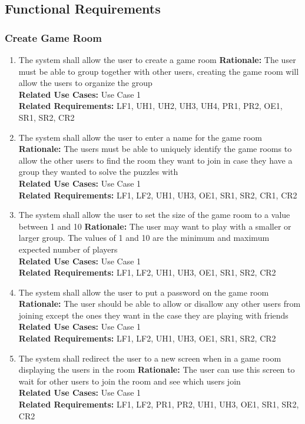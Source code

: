 \documentclass[12pt]{article}
\begin{document}
\subsection{Functional Requirements}
\subsubsection{Create Game Room}
\begin{enumerate}[label=CG\arabic*., series=CreateGame]
    \item The system shall allow the user to create a game room \newline 
    \textbf{Rationale:} The user must be able to group together with other users, creating the game room will allow the users to organize the group\\
    \textbf{Related Use Cases:} Use Case 1\\
    \textbf{Related Requirements:} LF1, UH1, UH2, UH3, UH4, PR1, PR2, OE1, SR1, SR2, CR2
    
    \item The system shall allow the user to enter a name for the game room \newline
    \textbf{Rationale:} The users must be able to uniquely identify the game rooms to allow the other users to find the room they want to join in case they have a group they wanted to solve the puzzles with\\
    \textbf{Related Use Cases:} Use Case 1\\
    \textbf{Related Requirements:} LF1, LF2, UH1, UH3, OE1, SR1, SR2, CR1, CR2
    
    \item The system shall allow the user to set the size of the game room to a value between 1 and 10 \newline
    \textbf{Rationale:} The user may want to play with a smaller or larger group. The values of 1 and 10 are the minimum and maximum expected number of players\\
    \textbf{Related Use Cases:} Use Case 1\\
    \textbf{Related Requirements:} LF1, LF2, UH1, UH3, OE1, SR1, SR2, CR2
    \item The system shall allow the user to put a password on the game room \newline
    \textbf{Rationale:} The user should be able to allow or disallow any other users from joining except the ones they want in the case they are playing with friends\\
    \textbf{Related Use Cases:} Use Case 1\\
    \textbf{Related Requirements:} LF1, LF2, UH1, UH3, OE1, SR1, SR2, CR2
    
    \item The system shall redirect the user to a new screen when in a game room displaying the users in the room\newline
    \textbf{Rationale: } The user can use this screen to wait for other users to join the room and see which users join\\
    \textbf{Related Use Cases:} Use Case 1\\
    \textbf{Related Requirements:} LF1, LF2, PR1, PR2, UH1, UH3, OE1, SR1, SR2, CR2
\end{enumerate}
\end{document}
